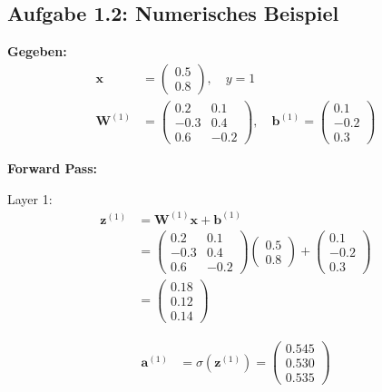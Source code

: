 ﻿\documentclass[12pt,a4paper]{article}
\begin{document}
\subsection{Aufgabe 1.2: Numerisches Beispiel}

\textbf{Gegeben:}
\begin{align}
\mathbf{x} &= \begin{pmatrix} 0.5 \\ 0.8 \end{pmatrix}, \quad y = 1 \\
\mathbf{W}^{(1)} &= \begin{pmatrix} 0.2 & 0.1 \\ -0.3 & 0.4 \\ 0.6 & -0.2 \end{pmatrix}, \quad \mathbf{b}^{(1)} = \begin{pmatrix} 0.1 \\ -0.2 \\ 0.3 \end{pmatrix}
\end{align}

\textbf{Forward Pass:}

Layer 1:
\begin{align}
\mathbf{z}^{(1)} &= \mathbf{W}^{(1)} \mathbf{x} + \mathbf{b}^{(1)} \\
&= \begin{pmatrix} 0.2 & 0.1 \\ -0.3 & 0.4 \\ 0.6 & -0.2 \end{pmatrix} \begin{pmatrix} 0.5 \\ 0.8 \end{pmatrix} + \begin{pmatrix} 0.1 \\ -0.2 \\ 0.3 \end{pmatrix} \\
&= \begin{pmatrix} 0.18 \\ 0.12 \\ 0.14 \end{pmatrix}
\end{align}

\begin{align}
\mathbf{a}^{(1)} &= \sigma(\mathbf{z}^{(1)}) = \begin{pmatrix} 0.545 \\ 0.530 \\ 0.535 \end{pmatrix}
\end{align}
\end{document}
